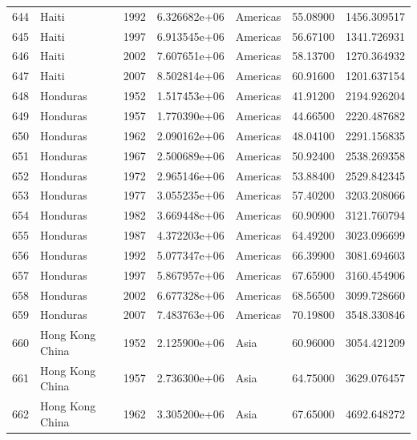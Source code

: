 \documentclass[
  letterpaper,
  DIV=11,
  numbers=noendperiod]{scrreprt}
\begin{document}
\begin{tabular}{llrrlrr}
644  &                     Haiti &  1992 &  6.326682e+06 &  Americas &  55.08900 &    1456.309517 \\
645  &                     Haiti &  1997 &  6.913545e+06 &  Americas &  56.67100 &    1341.726931 \\
646  &                     Haiti &  2002 &  7.607651e+06 &  Americas &  58.13700 &    1270.364932 \\
647  &                     Haiti &  2007 &  8.502814e+06 &  Americas &  60.91600 &    1201.637154 \\
648  &                  Honduras &  1952 &  1.517453e+06 &  Americas &  41.91200 &    2194.926204 \\
649  &                  Honduras &  1957 &  1.770390e+06 &  Americas &  44.66500 &    2220.487682 \\
650  &                  Honduras &  1962 &  2.090162e+06 &  Americas &  48.04100 &    2291.156835 \\
651  &                  Honduras &  1967 &  2.500689e+06 &  Americas &  50.92400 &    2538.269358 \\
652  &                  Honduras &  1972 &  2.965146e+06 &  Americas &  53.88400 &    2529.842345 \\
653  &                  Honduras &  1977 &  3.055235e+06 &  Americas &  57.40200 &    3203.208066 \\
654  &                  Honduras &  1982 &  3.669448e+06 &  Americas &  60.90900 &    3121.760794 \\
655  &                  Honduras &  1987 &  4.372203e+06 &  Americas &  64.49200 &    3023.096699 \\
656  &                  Honduras &  1992 &  5.077347e+06 &  Americas &  66.39900 &    3081.694603 \\
657  &                  Honduras &  1997 &  5.867957e+06 &  Americas &  67.65900 &    3160.454906 \\
658  &                  Honduras &  2002 &  6.677328e+06 &  Americas &  68.56500 &    3099.728660 \\
659  &                  Honduras &  2007 &  7.483763e+06 &  Americas &  70.19800 &    3548.330846 \\
660  &           Hong Kong China &  1952 &  2.125900e+06 &      Asia &  60.96000 &    3054.421209 \\
661  &           Hong Kong China &  1957 &  2.736300e+06 &      Asia &  64.75000 &    3629.076457 \\
662  &           Hong Kong China &  1962 &  3.305200e+06 &      Asia &  67.65000 &    4692.648272 \\

\end{tabular}
\end{document}
